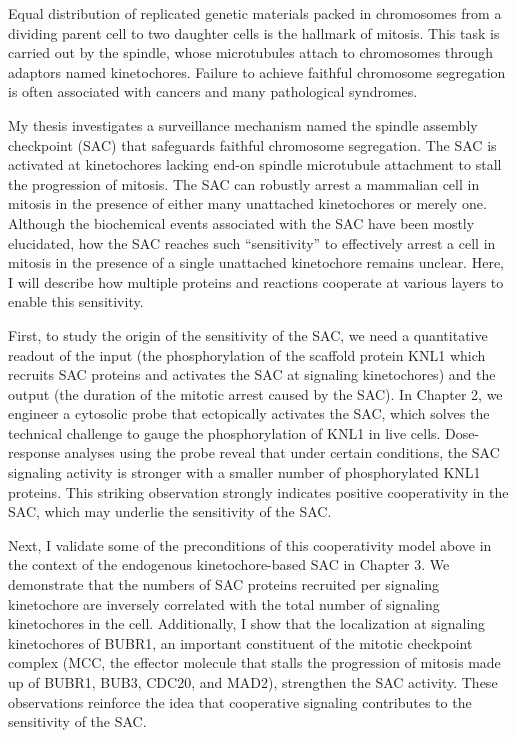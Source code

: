 Equal distribution of replicated genetic materials packed in chromosomes from a dividing parent cell to two daughter cells is the hallmark of mitosis. This task is carried out by the spindle, whose microtubules attach to chromosomes through adaptors named kinetochores. Failure to achieve faithful chromosome segregation is often associated with cancers and many pathological syndromes.

My thesis investigates a surveillance mechanism named the spindle assembly checkpoint (SAC) that safeguards faithful chromosome segregation. The SAC is activated at kinetochores lacking end-on spindle microtubule attachment to stall the progression of mitosis. The SAC can robustly arrest a mammalian cell in mitosis in the presence of either many unattached kinetochores or merely one. Although the biochemical events associated with the SAC have been mostly elucidated, how the SAC reaches such ``sensitivity'' to effectively arrest a cell in mitosis in the presence of a single unattached kinetochore remains unclear. Here, I will describe how multiple proteins and reactions cooperate at various layers to enable this sensitivity.

First, to study the origin of the sensitivity of the SAC, we need a quantitative readout of the input (the phosphorylation of the scaffold protein KNL1 which recruits SAC proteins and activates the SAC at signaling kinetochores) and the output (the duration of the mitotic arrest caused by the SAC). In Chapter 2, we engineer a cytosolic probe that ectopically activates the SAC, which solves the technical challenge to gauge the phosphorylation of KNL1 in live cells. Dose-response analyses using the probe reveal that under certain conditions, the SAC signaling activity is stronger with a smaller number of phosphorylated KNL1 proteins. This striking observation strongly indicates positive cooperativity in the SAC, which may underlie the sensitivity of the SAC.

Next, I validate some of the preconditions of this cooperativity model above in the context of the endogenous kinetochore-based SAC in Chapter 3. We demonstrate %
that the numbers of SAC proteins recruited per signaling kinetochore are inversely correlated with the total number of signaling kinetochores in the cell. Additionally, I show that the localization at signaling kinetochores of BUBR1, an important constituent of the mitotic checkpoint complex (MCC, the effector molecule that stalls the progression of mitosis made up of BUBR1, BUB3, CDC20, and MAD2), strengthen the SAC activity. These observations reinforce the idea that cooperative signaling contributes to the sensitivity of the SAC.

